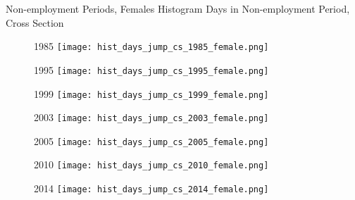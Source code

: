 \documentclass[hyperref={bookmarks=false}]{beamer}
\begin{document}
\begin{appendix}
\begin{frame}{Non-employment Periods, Females}
Histogram Days in Non-employment Period, Cross Section
\begin{figure}[!t]
\centering
\begin{minipage}[b]{0.3\textwidth}{1985}
\centering
\texttt{[image: hist\_days\_jump\_cs\_1985\_female.png]}
\end{minipage}
\begin{minipage}[b]{0.30\textwidth}{1995}
\centering
\texttt{[image: hist\_days\_jump\_cs\_1995\_female.png]}
\end{minipage}
\begin{minipage}[b]{0.30\textwidth}{1999}
\centering
\texttt{[image: hist\_days\_jump\_cs\_1999\_female.png]}
\end{minipage}
\begin{minipage}[b]{0.30\textwidth}{2003}
\centering
\texttt{[image: hist\_days\_jump\_cs\_2003\_female.png]}
\end{minipage}
\begin{minipage}[b]{0.30\textwidth}{2005}
\centering
\texttt{[image: hist\_days\_jump\_cs\_2005\_female.png]}
\end{minipage}
\begin{minipage}[b]{0.30\textwidth}{2010}
\centering
\texttt{[image: hist\_days\_jump\_cs\_2010\_female.png]}
\end{minipage}
\begin{minipage}[b]{0.30\textwidth}{2014}
\centering
\texttt{[image: hist\_days\_jump\_cs\_2014\_female.png]}
\end{minipage}
\end{figure}
\end{frame}


\end{appendix}
\end{document}
